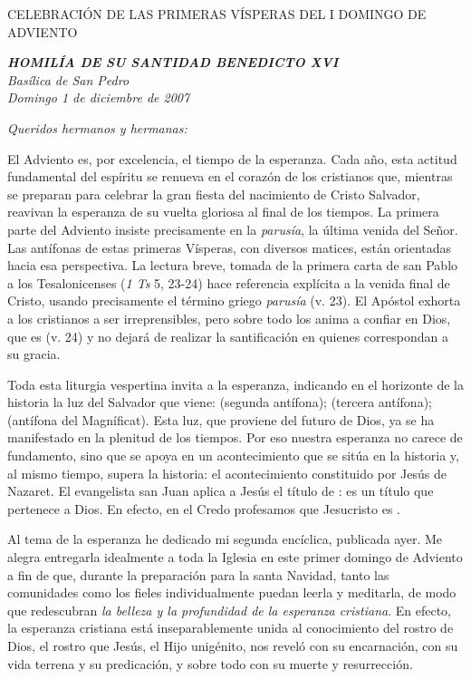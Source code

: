 CELEBRACIÓN DE LAS PRIMERAS VÍSPERAS DEL I DOMINGO DE ADVIENTO

\emph{\textbf{HOMILÍA DE SU SANTIDAD BENEDICTO XVI}\\[2\baselineskip]Basílica de San Pedro\\ Domingo 1 de diciembre de 2007}

\emph{Queridos hermanos y hermanas:}

El Adviento es, por excelencia, el tiempo de la esperanza. Cada año, esta actitud fundamental del espíritu se renueva en el corazón de los cristianos que, mientras se preparan para celebrar la gran fiesta del nacimiento de Cristo Salvador, reavivan la esperanza de su vuelta gloriosa al final de los tiempos. La primera parte del Adviento insiste precisamente en la \emph{parusía}, la última venida del Señor. Las antífonas de estas primeras Vísperas, con diversos matices, están orientadas hacia esa perspectiva. La lectura breve, tomada de la primera carta de san Pablo a los Tesalonicenses (\emph{1 Ts} 5, 23-24) hace referencia explícita a la venida final de Cristo, usando precisamente el término griego \emph{parusía} (v. 23). El Apóstol exhorta a los cristianos a ser irreprensibles, pero sobre todo los anima a confiar en Dios, que es  (v. 24) y no dejará de realizar la santificación en quienes correspondan a su gracia.

Toda esta liturgia vespertina invita a la esperanza, indicando en el horizonte de la historia la luz del Salvador que viene:  (segunda antífona);  (tercera antífona);  (antífona del Magníficat). Esta luz, que proviene del futuro de Dios, ya se ha manifestado en la plenitud de los tiempos. Por eso nuestra esperanza no carece de fundamento, sino que se apoya en un acontecimiento que se sitúa en la historia y, al mismo tiempo, supera la historia: el acontecimiento constituido por Jesús de Nazaret. El evangelista san Juan aplica a Jesús el título de : es un título que pertenece a Dios. En efecto, en el Credo profesamos que Jesucristo es .

Al tema de la esperanza he dedicado mi segunda encíclica, publicada ayer. Me alegra entregarla idealmente a toda la Iglesia en este primer domingo de Adviento a fin de que, durante la preparación para la santa Navidad, tanto las comunidades como los fieles individualmente puedan leerla y meditarla, de modo que redescubran \emph{la belleza y la profundidad de la esperanza cristiana}. En efecto, la esperanza cristiana está inseparablemente unida al conocimiento del rostro de Dios, el rostro que Jesús, el Hijo unigénito, nos reveló con su encarnación, con su vida terrena y su predicación, y sobre todo con su muerte y resurrección.

